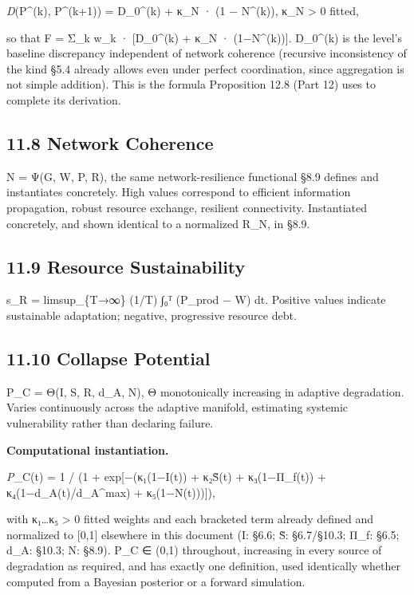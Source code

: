 \documentclass[
]{article}
\begin{document}
\emph{D}(P\^{}(k), P\^{}(k+1)) = D\_0\^{}(k) + κ\_N · (1 − N\^{}(k)),
κ\_N \textgreater{} 0 fitted,

so that F = Σ\_k w\_k · {[}D\_0\^{}(k) + κ\_N · (1−N\^{}(k)){]}.
D\_0\^{}(k) is the level's baseline discrepancy independent of network
coherence (recursive inconsistency of the kind §5.4 already allows even
under perfect coordination, since aggregation is not simple addition).
This is the formula Proposition 12.8 (Part 12) uses to complete its
derivation.

\hypertarget{network-coherence}{%
\subsection{11.8 Network Coherence}\label{network-coherence}}

N = Ψ(G, W, P, R), the same network-resilience functional §8.9 defines
and instantiates concretely. High values correspond to efficient
information propagation, robust resource exchange, resilient
connectivity. Instantiated concretely, and shown identical to a
normalized R\_N, in §8.9.

\hypertarget{resource-sustainability}{%
\subsection{11.9 Resource
Sustainability}\label{resource-sustainability}}

s\_R = limsup\_\{T→∞\} (1/T) ∫₀ᵀ (P\_prod − W) dt. Positive values
indicate sustainable adaptation; negative, progressive resource debt.

\hypertarget{collapse-potential}{%
\subsection{11.10 Collapse Potential}\label{collapse-potential}}

P\_C = Θ(I, S, R, d\_A, N), Θ monotonically increasing in adaptive
degradation. Varies continuously across the adaptive manifold,
estimating systemic vulnerability rather than declaring failure.

\textbf{Computational instantiation.}

\emph{P}\_C(t) = 1 / (1 + exp{[}−(κ₁(1−I(t)) + κ₂S̃(t) + κ₃(1−Π\_f(t)) +
κ₄(1−d\_A(t)/d\_A\^{}max) + κ₅(1−N(t))){]}),

with κ₁\ldots κ₅ \textgreater{} 0 fitted weights and each bracketed term
already defined and normalized to {[}0,1{]} elsewhere in this document
(I: §6.6; S̃: §6.7/§10.3; Π\_f: §6.5; d\_A: §10.3; N: §8.9). P\_C ∈ (0,1)
throughout, increasing in every source of degradation as required, and
has exactly one definition, used identically whether computed from a
Bayesian posterior or a forward simulation.
\end{document}
